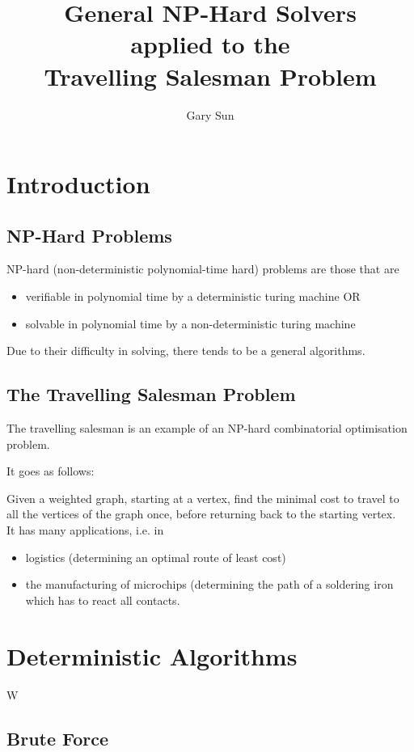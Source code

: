 \documentclass{article}
\title{
    General NP-Hard Solvers \\
    \large applied to the \\
    Travelling Salesman Problem
}
\author{Gary Sun}
\date{}
\begin{document}
\maketitle

\section{Introduction}
\subsection{NP-Hard Problems}
NP-hard (non-deterministic polynomial-time hard) problems are those that are 
\begin{itemize}
    \item verifiable in polynomial time by a deterministic turing machine OR
    \item solvable in polynomial time by a non-deterministic turing machine
\end{itemize}

Due to their difficulty in solving, there tends to be a general algorithms.

\subsection{The Travelling Salesman Problem}
The travelling salesman is an example of an NP-hard combinatorial optimisation problem.

It goes as follows:

Given a weighted graph, starting at a vertex, find the minimal cost to travel to all the vertices of the graph once, before returning back to the starting vertex.
\\
It has many applications, i.e. in

\begin{itemize}
    \item logistics (determining an optimal route of least cost)
    \item the manufacturing of microchips (determining the path of a soldering iron which has to react all contacts.
\end{itemize}

\section{Deterministic Algorithms}

W

\subsection{Brute Force}
\end{document}
